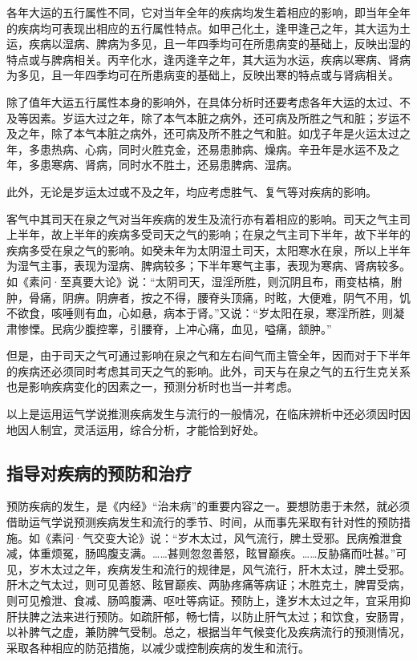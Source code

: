 \documentclass[12pt]{ctexbook}
\begin{document}
各年大运的五行属性不同，它对当年全年的疾病均发生着相应的影响，即当年全年的疾病均可表现出相应的五行属性特点。如甲己化土，逢甲逢己之年，其大运为土运，疾病以湿病、脾病为多见，且一年四季均可在所患病变的基础上，反映出湿的特点或与脾病相关。丙辛化水，逢丙逢辛之年，其大运为水运，疾病以寒病、肾病为多见，且一年四季均可在所患病变的基础上，反映出寒的特点或与肾病相关。

除了值年大运五行属性本身的影响外，在具体分析时还要考虑各年大运的太过、不及等因素。岁运大过之年，除了本气本脏之病外，还可病及所胜之气和脏；岁运不及之年，除了本气本脏之病外，还可病及所不胜之气和脏。如戊子年是火运太过之年，多患热病、心病，同时火胜克金，还易患肺病、燥病。辛丑年是水运不及之年，多患寒病、肾病，同时水不胜土，还易患脾病、湿病。

此外，无论是岁运太过或不及之年，均应考虑胜气、复气等对疾病的影响。

客气中其司天在泉之气对当年疾病的发生及流行亦有着相应的影响。司天之气主司上半年，故上半年的疾病多受司天之气的影响；在泉之气主司下半年，故下半年的疾病多受在泉之气的影响。如癸未年为太阴湿土司天，太阳寒水在泉，所以上半年为湿气主事，表现为湿病、脾病较多；下半年寒气主事，表现为寒病、肾病较多。如《素问·至真要大论》说：“太阴司天，湿淫所胜，则沉阴且布，雨变枯槁，胕肿，骨痛，阴痹。阴痹者，按之不得，腰脊头顶痛，时眩，大便难，阴气不用，饥不欲食，咳唾则有血，心如悬，病本于肾。”又说：“岁太阳在泉，寒淫所胜，则凝肃惨慄。民病少腹控睾，引腰脊，上冲心痛，血见，嗌痛，颔肿。”

但是，由于司天之气可通过影响在泉之气和左右间气而主管全年，因而对于下半年的疾病还必须同时考虑其司天之气的影响。此外，司天与在泉之气的五行生克关系也是影响疾病变化的因素之一，预测分析时也当一并考虑。

以上是运用运气学说推测疾病发生与流行的一般情况，在临床辨析中还必须因时因地因人制宜，灵活运用，综合分析，才能恰到好处。

\subsection{指导对疾病的预防和治疗}%

预防疾病的发生，是《内经》“治未病”的重要内容之一。要想防患于未然，就必须借助运气学说预测疾病发生和流行的季节、时间，从而事先采取有针对性的预防措施。如《素问·气交变大论》说：“岁木太过，风气流行，脾土受邪。民病飧泄食减，体重烦冤，肠鸣腹支满。……甚则忽忽善怒，眩冒巅疾。……反胁痛而吐甚。”可见，岁木太过之年，疾病发生和流行的规律是，风气流行，肝木太过，脾土受邪。肝木之气太过，则可见善怒、眩冒巅疾、两胁疼痛等病证；木胜克土，脾胃受病，则可见飧泄、食减、肠鸣腹满、呕吐等病证。预防上，逢岁木太过之年，宜采用抑肝扶脾之法来进行预防。如疏肝郁，畅七情，以防止肝气太过；和饮食，安肠胃，以补脾气之虚，兼防脾气受制。总之，根据当年气候变化及疾病流行的预测情况，采取各种相应的防范措施，以减少或控制疾病的发生和流行。
\end{document}
